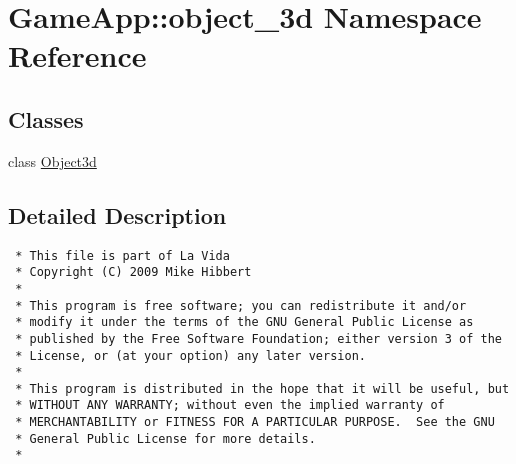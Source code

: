 \hypertarget{namespaceGameApp_1_1object__3d}{
\section{GameApp::object\_\-3d Namespace Reference}
\label{namespaceGameApp_1_1object__3d}
}


\subsection*{Classes}
\begin{CompactItemize}
\item 
class \hyperlink{classGameApp_1_1object__3d_1_1Object3d}{Object3d}
\end{CompactItemize}


\subsection{Detailed Description}


\footnotesize\begin{verbatim}
 * This file is part of La Vida
 * Copyright (C) 2009 Mike Hibbert
 *
 * This program is free software; you can redistribute it and/or
 * modify it under the terms of the GNU General Public License as
 * published by the Free Software Foundation; either version 3 of the
 * License, or (at your option) any later version.
 *
 * This program is distributed in the hope that it will be useful, but
 * WITHOUT ANY WARRANTY; without even the implied warranty of
 * MERCHANTABILITY or FITNESS FOR A PARTICULAR PURPOSE.  See the GNU
 * General Public License for more details.
 *
\end{verbatim}
\normalsize
 
